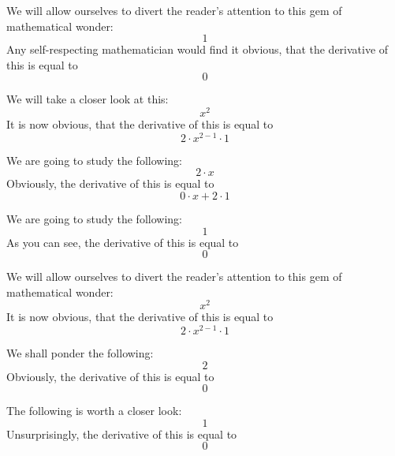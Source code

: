 \documentclass{article}
\begin{document}
We will allow ourselves to divert the reader's attention to this gem of mathematical wonder:
\begin{equation}
1 
\end{equation}
Any self-respecting mathematician would find it obvious, that the derivative of this is equal to
\begin{equation}
0 
\end{equation}

We will take a closer look at this:
\begin{equation}
x ^{2 } 
\end{equation}
It is now obvious, that the derivative of this is equal to
\begin{equation}
2 \cdot x ^{2 - 1 } \cdot 1 
\end{equation}

We are going to study the following:
\begin{equation}
2 \cdot x 
\end{equation}
Obviously, the derivative of this is equal to
\begin{equation}
0 \cdot x + 2 \cdot 1 
\end{equation}

We are going to study the following:
\begin{equation}
1 
\end{equation}
As you can see, the derivative of this is equal to
\begin{equation}
0 
\end{equation}

We will allow ourselves to divert the reader's attention to this gem of mathematical wonder:
\begin{equation}
x ^{2 } 
\end{equation}
It is now obvious, that the derivative of this is equal to
\begin{equation}
2 \cdot x ^{2 - 1 } \cdot 1 
\end{equation}

We shall ponder the following:
\begin{equation}
2 
\end{equation}
Obviously, the derivative of this is equal to
\begin{equation}
0 
\end{equation}

The following is worth a closer look:
\begin{equation}
1 
\end{equation}
Unsurprisingly, the derivative of this is equal to
\begin{equation}
0 
\end{equation}
\end{document}
